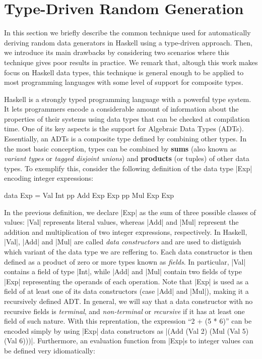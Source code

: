 \section{Type-Driven Random Generation} \label{sec:randomtesting}

In this section we briefly describe the common technique used for automatically
deriving random data generators in Haskell using a type-driven approach.
%
Then, we introduce its main drawbacks by considering two scenarios where this
technique gives poor results in practice.
%
We remark that, altough this work makes focus on Haskell data types, this
technique is general enough to be applied to most programming languages with
some level of support for composite types.


Haskell is a strongly typed programming language with a powerful type system.
%
It lets programmers encode a considerable amount of information about the
properties of their systems using data types that can be checked at compilation
time.
%
One of its key aspects is the support for Algebraic Data Types (ADTs).
%
Essentially, an ADTs is a composite type defined by combining other types.
%
In the most basic conception, types can be combined by \textbf{sums} (also known
as \emph{variant types} or \emph{tagged disjoint unions}) and \textbf{products}
(or tuples) of other data types.
%
To exemplify this, consider the following definition of the data type |Exp|
encoding integer expressions:

\begin{code}
data Exp  =   Val  Int
          pp  Add  Exp  Exp
          pp  Mul  Exp  Exp
\end{code}

In the previous definition, we declare |Exp| as the sum of three possible
classes of values: |Val| represents literal values, whereas |Add| and |Mul|
represent the addition and multiplication of two integer expressions,
respectively.
%
In Haskell, |Val|, |Add| and |Mul| are called \emph{data constructors} and are
used to distiguish which variant of the data type we are reffering to.
%
Each data constructor is then defined as a product of zero or more types known
as \emph{fields}.
%
In particular, |Val| contains a field of type |Int|, while |Add| and |Mul|
contain two fields of type |Exp| representing the operands of each operation.
%
Note that |Exp| is used as a field of at least one of its data constructors
(case |Add| and |Mul|), making it a recursively defined ADT.
%
In general, we will say that a data constructor with no recursive fields is
\emph{terminal}, and \emph{non-terminal} or \emph{recursive} if it has at least
one field of such nature.
%
With this reprentation, the expression ``2 + (5 * 6)'' can be encoded simply by
using |Exp| data constructors as |(Add (Val 2) (Mul (Val 5) (Val 6)))|.
%
Furthermore, an evaluation function from |Exp|s to integer values can be defined
very idiomatically:

